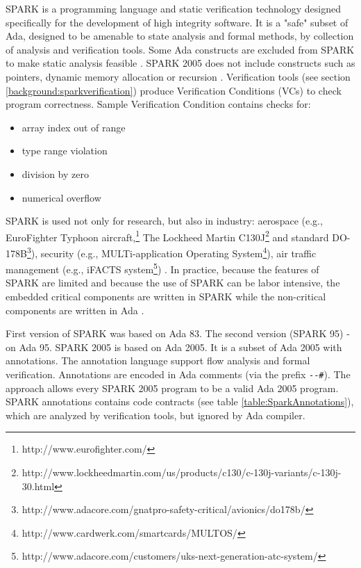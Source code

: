 SPARK is a programming language and static verification technology designed specifically for the development of high integrity software. It is a "safe" subset of Ada, designed to be amenable to state analysis and formal methods, by collection of analysis and verification tools. Some Ada constructs are excluded from SPARK to make static analysis feasible \cite{Spark:Article}. SPARK 2005 does not include constructs such as pointers, dynamic memory allocation or recursion \cite{Spark:Article}. Verification tools (see section \ref{background:sparkverification}) produce Verification Conditions (VCs) to check program correctness. Sample Verification Condition contains checks for:
\begin{itemize} \itemsep1pt \parskip0pt 
    \item array index out of range
    \item type range violation
    \item division by zero
    \item numerical overflow
\end{itemize}

SPARK is used not only for research, but also in industry: aerospace (e.g., EuroFighter Typhoon aircraft,\footnote{http://www.eurofighter.com/} The Lockheed Martin C130J\footnote{http://www.lockheedmartin.com/us/products/c130/c-130j-variants/c-130j-30.html} and standard DO-178B\footnote{http://www.adacore.com/gnatpro-safety-critical/avionics/do178b/}), security (e.g., MULTi-application Operating System\footnote{http://www.cardwerk.com/smartcards/MULTOS/}), air traffic management (e.g., iFACTS system\footnote{http://www.adacore.com/customers/uks-next-generation-atc-system/}) \cite{Barnes:Book}. In practice, because the features of SPARK are limited and because the use of SPARK can be labor intensive, the embedded critical components are written in SPARK while the non-critical components are written in Ada \cite{Spark:IndustrialExp}.

First version of SPARK was based on Ada 83. The second version (SPARK 95) - on Ada 95. SPARK 2005 is based on Ada 2005. It is a subset of Ada 2005 with annotations. The annotation language support flow analysis and formal verification. Annotations are encoded in Ada comments (via the prefix \lstinline{--#}). The approach allows every SPARK 2005 program to be a valid Ada 2005 program. SPARK annotations contains code contracts (see table \ref{table:SparkAnnotations}), which are analyzed by verification tools, but ignored by Ada compiler.

